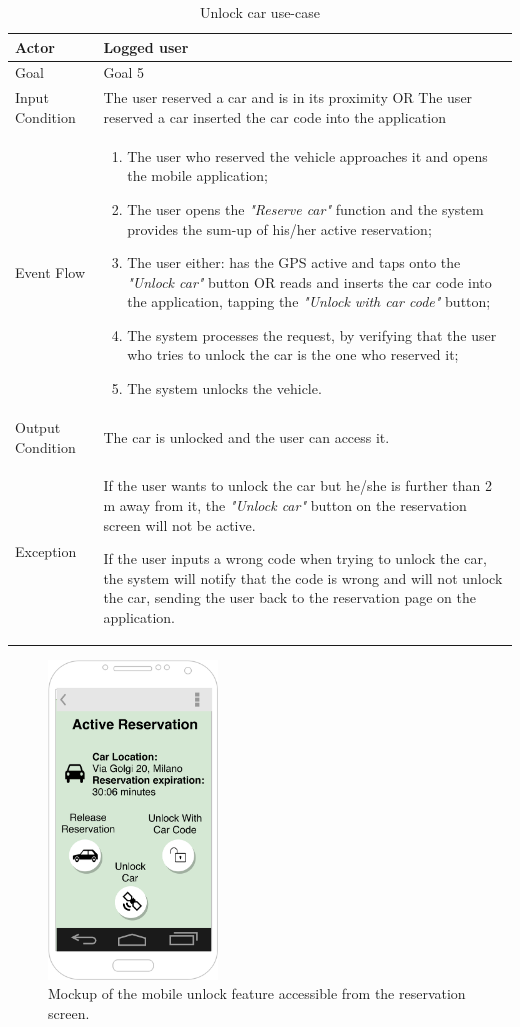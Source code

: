 \begin{table}[H]
\begin{center}
\begin{tabular}{p{} | p{}}
\hline
Actor & Logged user\\
\hline
Goal & Goal 5\\
\hline
Input Condition & The user reserved a car and is in its proximity OR The user reserved a car inserted the car code into the application\\
\hline
Event Flow & 
\begin{enumerate}
\item The user who reserved the vehicle approaches it and opens the mobile application;
\item The user opens the \emph{"Reserve car"} function and the system provides the sum-up of his/her active reservation;
\item The user either: has the GPS active and taps onto the \emph{"Unlock car"} button OR reads and inserts the car code into the application, tapping the \emph{"Unlock with car code"} button;
\item The system processes the request, by verifying that the user who tries to unlock the car is the one who reserved it;
\item The system unlocks the vehicle.
\end{enumerate} \\
\hline
Output Condition & The car is unlocked and the user can access it.\\
\hline
Exception & If the user wants to unlock the car but he/she is further than 2 m away from it, the \emph{"Unlock car"} button on the reservation screen will not be active.

If the user inputs a wrong code when trying to unlock the car, the system will notify that the code is wrong and will not unlock the car, sending the user back to the reservation page on the application.\\
\hline
\end{tabular}
\end{center}
\caption{Unlock car use-case}
\label{unlock_car_uc}
\end{table}

\begin{figure}[H]
\begin{center}
		\includegraphics[width=0.4\textwidth]{./specific_requirements/features/diagrams/mobile_unlock.png}
		\caption{Mockup of the mobile unlock feature accessible from the reservation screen.}
		\label{mobile_unlock}
\end{center}
\end{figure}
